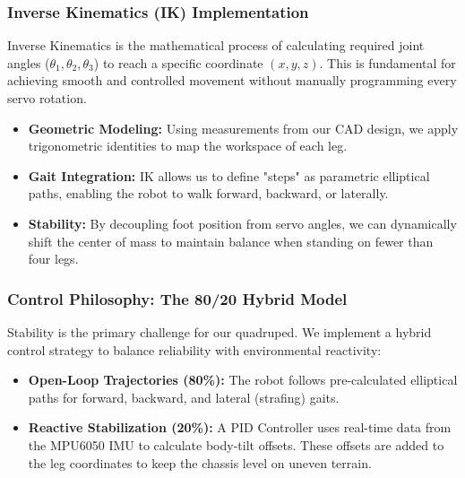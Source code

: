 \documentclass{article}
\begin{document}
\subsubsection{Inverse Kinematics (IK) Implementation}
Inverse Kinematics is the mathematical process of calculating required joint angles ($\theta_1, \theta_2, \theta_3$) to reach a specific coordinate $(x, y, z)$. This is fundamental for achieving smooth and controlled movement without manually programming every servo rotation.
\begin{itemize}
  \item \textbf{Geometric Modeling:} Using measurements from our CAD design, we apply trigonometric identities to map the workspace of each leg.
  \item \textbf{Gait Integration:} IK allows us to define "steps" as parametric elliptical paths, enabling the robot to walk forward, backward, or laterally.
  \item \textbf{Stability:} By decoupling foot position from servo angles, we can dynamically shift the center of mass to maintain balance when standing on fewer than four legs.
\end{itemize}

\subsubsection{Control Philosophy: The 80/20 Hybrid Model}
Stability is the primary challenge for our quadruped. We implement a hybrid control strategy to balance reliability with environmental reactivity:
\begin{itemize}
  \item \textbf{Open-Loop Trajectories (80\%):} The robot follows pre-calculated elliptical paths for forward, backward, and lateral (strafing) gaits.
  \item \textbf{Reactive Stabilization (20\%):} A PID Controller uses real-time data from the MPU6050 IMU to calculate body-tilt offsets. These offsets are added to the leg coordinates to keep the chassis level on uneven terrain.
\end{itemize}
\end{document}
